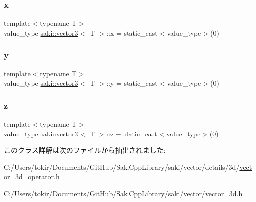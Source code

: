 \subsubsection{\texorpdfstring{x}{x}}
{\footnotesize\ttfamily template$<$typename T$>$ \\
value\+\_\+type \mbox{\hyperlink{classsaki_1_1vector3}{saki\+::vector3}}$<$ T $>$\+::x = static\+\_\+cast$<$value\+\_\+type$>$(0)}

\mbox{\label{classsaki_1_1vector3_a5ecb4148ebb05a45be8371459a57b1b2}} 
\subsubsection{\texorpdfstring{y}{y}}
{\footnotesize\ttfamily template$<$typename T$>$ \\
value\+\_\+type \mbox{\hyperlink{classsaki_1_1vector3}{saki\+::vector3}}$<$ T $>$\+::y = static\+\_\+cast$<$value\+\_\+type$>$(0)}

\mbox{\label{classsaki_1_1vector3_a910df22d3a9c3a2da377756454f3b645}} 
\subsubsection{\texorpdfstring{z}{z}}
{\footnotesize\ttfamily template$<$typename T$>$ \\
value\+\_\+type \mbox{\hyperlink{classsaki_1_1vector3}{saki\+::vector3}}$<$ T $>$\+::z = static\+\_\+cast$<$value\+\_\+type$>$(0)}



このクラス詳解は次のファイルから抽出されました\+:\begin{DoxyCompactItemize}
\item 
C\+:/\+Users/tokir/\+Documents/\+Git\+Hub/\+Saki\+Cpp\+Library/saki/vector/details/3d/\mbox{\hyperlink{vector__3d__operator_8h}{vector\+\_\+3d\+\_\+operator.\+h}}\item 
C\+:/\+Users/tokir/\+Documents/\+Git\+Hub/\+Saki\+Cpp\+Library/saki/vector/\mbox{\hyperlink{vector__3d_8h}{vector\+\_\+3d.\+h}}\end{DoxyCompactItemize}

